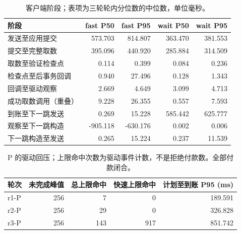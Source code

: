 \begin{table}[htbp]
\centering\small
\caption{客户端阶段；表项为三轮轮内分位数的中位数，单位毫秒。}
\label{tab:final-evidence-stages}
\begin{tabular}{lrrrr}\toprule
阶段 & fast P50 & fast P95 & wait P50 & wait P95 \\\midrule
发送至应用提交 & 573.703 & 814.807 & 363.470 & 381.553 \\
提交至完整取数 & 395.096 & 440.920 & 285.884 & 314.509 \\
取数至验证检查点 & 0.114 & 0.399 & 0.084 & 0.236 \\
检查点至后事务回调 & 0.940 & 27.496 & 0.128 & 1.343 \\
回调至驱动观察 & 2.669 & 4.649 & 3.099 & 4.713 \\
成功取数调用（重叠） & 9.228 & 26.355 & 0.557 & 7.593 \\
到账至下一跳发送 & 0.269 & 15.228 & 585.442 & 625.777 \\
观察至下一跳构造 & -905.118 & -630.176 & 0.002 & 0.006 \\
下一跳构造至发送 & 0.265 & 15.224 & 0.237 & 11.539 \\
\bottomrule\end{tabular}
\end{table}


\begin{table}[htbp]
\centering\small
\caption{P 的驱动回压；上限命中次数为驱动事件计数，不是拒绝付款数。全部付款闭合。}
\label{tab:final-evidence-pressure}
\begin{tabular}{lrrrr}\toprule
轮次 & 未完成峰值 & 总上限命中 & 快速上限命中 & 计划至到账 P95 (ms) \\\midrule
r1-P & 256 & 7 & 0 & 189.591 \\
r2-P & 256 & 29 & 0 & 326.828 \\
r3-P & 256 & 143 & 917 & 851.742 \\
\bottomrule\end{tabular}
\end{table}

\clearpage
\begingroup
\small
\setlength{\tabcolsep}{3pt}
\setlength{\LTleft}{0pt}
\setlength{\LTright}{0pt}
\setlength{\LTcapwidth}{\textwidth}
\renewcommand{\arraystretch}{1.10}

